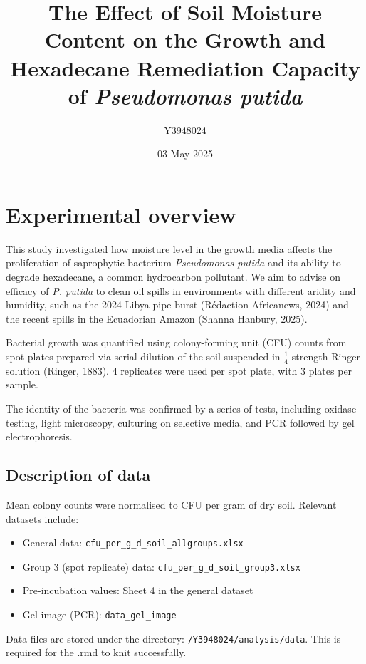 \documentclass[
]{article}
\title{The Effect of Soil Moisture Content on the Growth and Hexadecane
Remediation Capacity of \emph{Pseudomonas putida}}
\author{Y3948024}
\date{03 May 2025}
\providecommand{\tightlist}{%
  \setlength{\itemsep}{0pt}\setlength{\parskip}{0pt}}
\begin{document}
\maketitle

\section{Experimental overview}\label{experimental-overview}

This study investigated how moisture level in the growth media affects
the proliferation of saprophytic bacterium \emph{Pseudomonas putida} and
its ability to degrade hexadecane, a common hydrocarbon pollutant. We
aim to advise on efficacy of \emph{P. putida} to clean oil spills in
environments with different aridity and humidity, such as the 2024 Libya
pipe burst (Rédaction Africanews, 2024) and the recent spills in the
Ecuadorian Amazon (Shanna Hanbury, 2025).

Bacterial growth was quantified using colony-forming unit (CFU) counts
from spot plates prepared via serial dilution of the soil suspended in
\(\frac{1}{4}\) strength Ringer solution (Ringer, 1883). 4 replicates
were used per spot plate, with 3 plates per sample.

The identity of the bacteria was confirmed by a series of tests,
including oxidase testing, light microscopy, culturing on selective
media, and PCR followed by gel electrophoresis.

\subsection{Description of data}\label{description-of-data}

Mean colony counts were normalised to CFU per gram of dry soil. Relevant
datasets include:

\begin{itemize}
\tightlist
\item
  General data: \texttt{cfu\_per\_g\_d\_soil\_allgroups.xlsx}
\item
  Group 3 (spot replicate) data:
  \texttt{cfu\_per\_g\_d\_soil\_group3.xlsx}
\item
  Pre-incubation values: Sheet 4 in the general dataset
\item
  Gel image (PCR): \texttt{data\_gel\_image}
\end{itemize}

Data files are stored under the directory:
\texttt{/Y3948024/analysis/data}. This is required for the .rmd to knit
successfully.
\end{document}
